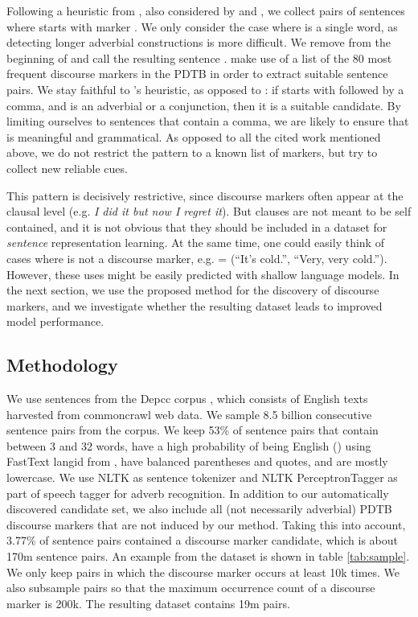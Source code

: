 \documentclass[11pt,a4paper]{article}
\begin{document}
Following a heuristic from \citet{RutherfordX15}, also considered by \citet{Malmi2018} and \citet{Jernite2017}, we collect pairs of sentences  where  starts with marker . We only consider the case where  is a single word, as detecting longer adverbial constructions is more difficult. We remove   from the beginning of  and call the resulting sentence . 
\citet{Malmi2018}  make use of a list of the 80 most frequent discourse markers in the PDTB in order to extract suitable sentence pairs.
We stay faithful to \citet{RutherfordX15}'s heuristic, as opposed to 
\citet{Malmi2018,Jernite2017}: if  starts with  followed by a comma, and  is an adverbial or a conjunction, then it is a suitable candidate. By limiting ourselves to sentences that contain a comma, we are likely to ensure that  is meaningful and grammatical. As opposed to all the cited work mentioned above, we do not restrict the pattern to a known list of markers, but try to collect new reliable cues. 

This pattern is decisively restrictive, since discourse markers often appear at the clausal level (e.g. \textit{I did it but now I regret it}).
But clauses are not meant to be self contained, and it is not obvious that they should be included in a dataset for \textit{sentence} representation learning. At the same time, one could easily think of cases where  is not a discourse marker, e.g. = (``It's cold.'', ``Very, very cold.''). However, these uses might be easily predicted with shallow language models.
In the next section, we use the proposed method for the discovery of discourse markers, and we investigate whether the resulting dataset leads to improved model performance.


\subsection{Methodology}

We use sentences from the Depcc corpus \citep{Panchenko2017}, which consists of English texts harvested from commoncrawl web data. We sample 8.5 billion consecutive sentence pairs from the corpus.
We keep 53\% of sentence pairs that contain between 3 and 32 words, have a high probability of being English () using FastText langid from \citet{GRAVE18.627}, have balanced parentheses and quotes, and are mostly lowercase. 
We use NLTK \citep{Bird2009} as sentence tokenizer and NLTK PerceptronTagger as part of speech tagger for adverb recognition.
In addition to our automatically discovered candidate set, we also include all (not necessarily adverbial) PDTB discourse markers that are not induced by our method. Taking this into account, 3.77\% of sentence pairs contained a discourse marker candidate, which is about 170{\sc m} sentence pairs. 
An example from the dataset is shown in table \ref{tab:sample}.
We only keep pairs in which the discourse marker occurs at least 10{\sc k} times. We also subsample pairs so that the maximum occurrence count of a discourse marker is 200{\sc k}.  The resulting dataset contains 19{\sc m} pairs. 
\end{document}
